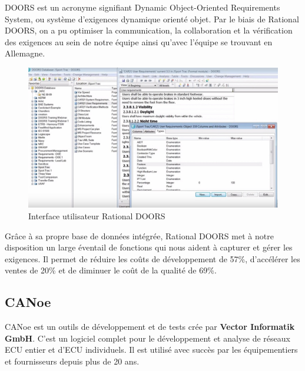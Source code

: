 DOORS est un acronyme signifiant Dynamic Object-Oriented Requirements System, ou système d'exigences dynamique orienté objet. Par le biais de Rational DOORS, on a pu optimiser la communication, la collaboration et la vérification des exigences au sein de notre équipe ainsi qu'avec l'équipe se trouvant en Allemagne.

\begin{figure}[H]
 \centering
 \includegraphics[scale=0.4]{images/interface_doors}
 \caption{Interface utilisateur Rational DOORS}
\end{figure}

Grâce à sa propre base de données intégrée, Rational DOORS met à notre disposition un large éventail de fonctions qui nous aident à capturer et gérer les exigences. Il permet de réduire les coûts de développement de 57\%, d'accélérer les ventes de 20\% et de diminuer le coût de la qualité de 69\%.

\subsection{CANoe}

CANoe est un outils de développement et de tests crée par \textbf{Vector Informatik GmbH}. C'est un logiciel complet pour le développement et analyse de réseaux ECU entier et d'ECU individuels. Il est utilisé avec succès par les équipementiers et fournisseurs depuis plus de 20 ans.

